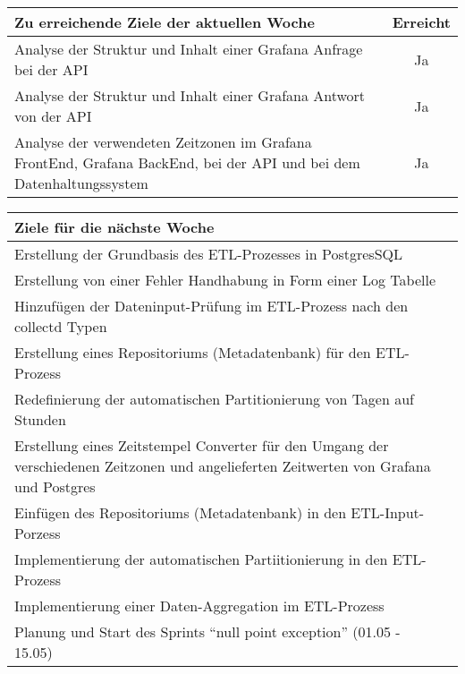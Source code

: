 \begin{tabularx}{\textwidth}{Xc}
    \arrayrulecolor{OliveGreen}
    \toprule
    {\bfseries Zu erreichende Ziele der aktuellen Woche} & {\bfseries Erreicht} \\
    \midrule[2pt]
    Analyse der Struktur und Inhalt einer Grafana Anfrage bei der API  & Ja \\
    \rowcolor{OliveGreen!15}
    Analyse der Struktur und Inhalt einer Grafana Antwort von der API  & Ja \\
    \rowcolor{White}
    Analyse der verwendeten Zeitzonen im Grafana FrontEnd, Grafana BackEnd, bei
    der API und bei dem Datenhaltungssystem  & Ja \\
    \bottomrule[2pt]
\end{tabularx}
%
\vspace{1cm}
%
\begin{tabularx}{\textwidth}{Xc}
    \arrayrulecolor{OliveGreen}
    \toprule
    {\bfseries Ziele für die nächste Woche}              &                   \\
    \midrule[2pt]
    Erstellung der Grundbasis des ETL-Prozesses in PostgresSQL & \\
    \rowcolor{OliveGreen!15}
    Erstellung von einer Fehler Handhabung in Form einer Log Tabelle & \\
    \rowcolor{White}
    Hinzufügen der Dateninput-Prüfung im ETL-Prozess nach den collectd Typen & \\
    \rowcolor{OliveGreen!15}
    Erstellung eines Repositoriums (Metadatenbank) für den ETL-Prozess & \\
    \rowcolor{White}
    Redefinierung der automatischen Partitionierung von Tagen auf Stunden & \\
    \rowcolor{OliveGreen!15}
    Erstellung eines Zeitstempel Converter für den Umgang der verschiedenen 
    Zeitzonen und angelieferten Zeitwerten von Grafana und Postgres & \\
    \rowcolor{White}
    Einfügen des Repositoriums (Metadatenbank) in den ETL-Input-Porzess & \\
    \rowcolor{OliveGreen!15}
    Implementierung der automatischen Partiitionierung in den ETL-Prozess & \\
    \rowcolor{White}
    Implementierung einer Daten-Aggregation im ETL-Prozess & \\
    \rowcolor{OliveGreen!15}
    Planung und Start des Sprints ``null point exception'' (01.05 - 15.05) & \\
\end{tabularx}
